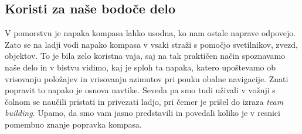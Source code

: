 \subsection{Koristi za naše bodoče delo}
\label{sec:2}
V pomorstvu je napaka kompasa lahko usodna,  ko nam ostale naprave odpovejo. Zato se na ladji vodi napako kompasa v vsaki straži s pomočjo svetilnikov, zvezd, objektov. To je bila zelo koristna vaja, saj na tak praktičen način spoznavamo naše delo in v bistvu vidimo, kaj je sploh ta napaka, katero upoštevamo ob vrisovanju položajev in vrisovanju azimutov pri pouku obalne navigacije. Znati popravit to napako je osnova navtike. Seveda pa smo tudi uživali v vožnji s čolnom se naučili pristati in privezati ladjo, pri čemer je prišel do izraza \textit{team building}. Upamo, da smo vam jasno predstavili in povedali koliko je v resnici pomembno znanje popravka kompasa.




%
